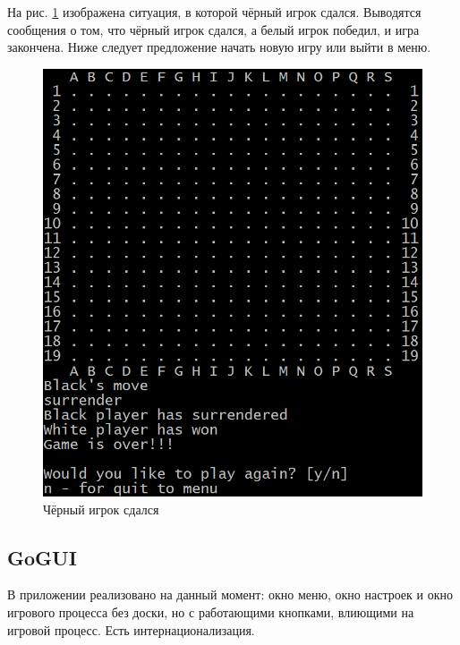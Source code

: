 На рис. \ref{pic:CUI_Surrender} изображена ситуация, в которой чёрный игрок сдался. Выводятся сообщения о том, что чёрный игрок сдался, а белый игрок победил, и игра закончена. Ниже следует предложение начать новую игру или выйти в меню.

\begin{figure}[H]
	\begin{center}
		\includegraphics[scale=0.6]{pics/GoCUI/Surrender.png}
	    \caption{Чёрный игрок сдался} 
		\label{pic:CUI_Surrender}
	\end{center}
\end{figure}

\subsection*{GoGUI}

В приложении реализовано на данный момент: окно меню, окно настроек и окно игрового процесса без доски, но с работающими кнопками,
влиющими на игровой процесс. Есть интернационализация.

